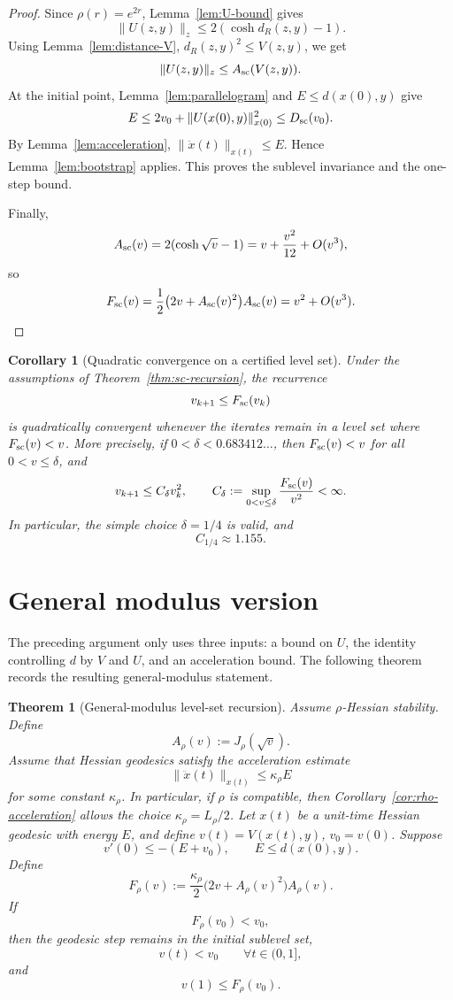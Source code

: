 \documentclass[11pt]{article}
\newtheorem{theorem}{Theorem}
\newtheorem{corollary}{Corollary}
\begin{document}
\begin{proof}
Since \(\rho(r)=e^{2r}\), Lemma~\ref{lem:U-bound} gives
\[
    \|U(z,y)\|_z
    \le
    2(\cosh d_R(z,y)-1).
\]
Using Lemma~\ref{lem:distance-V}, \(d_R(z,y)^2\le V(z,y)\), we get
\[
    \|U(z,y)\|_z
    \le
    A_{\rm sc}(V(z,y)).
\]
At the initial point, Lemma~\ref{lem:parallelogram} and \(E\le d(x(0),y)\) give
\[
    E
    \le
    2v_0+\|U(x(0),y)\|_{x(0)}^2
    \le
    D_{\rm sc}(v_0).
\]
By Lemma~\ref{lem:acceleration}, \(\|\ddot x(t)\|_{x(t)}\le E\). Hence Lemma~\ref{lem:bootstrap} applies.
This proves the sublevel invariance and the one-step bound.

Finally,
\[
    A_{\rm sc}(v)=2(\cosh\sqrt v-1)=v+\frac{v^2}{12}+O(v^3),
\]
so
\[
    F_{\rm sc}(v)
    =
    \frac12\bigl(2v+A_{\rm sc}(v)^2\bigr)A_{\rm sc}(v)
    =v^2+O(v^3).
\]
\end{proof}

\begin{corollary}[Quadratic convergence on a certified level set]
Under the assumptions of Theorem~\ref{thm:sc-recursion}, the recurrence
\[
    v_{k+1}\le F_{\rm sc}(v_k)
\]
is quadratically convergent whenever the iterates remain in a level set where \(F_{\rm sc}(v)<v\). More precisely, if \(0<\delta<0.683412\ldots\), then \(F_{\rm sc}(v)<v\) for all \(0<v\le\delta\), and
\[
    v_{k+1}\le C_\delta v_k^2,
    \qquad
    C_\delta:=\sup_{0<v\le\delta}\frac{F_{\rm sc}(v)}{v^2}<\infty.
\]
In particular, the simple choice \(\delta=1/4\) is valid, and
\[
    C_{1/4}\approx 1.155.
\]
\end{corollary}


\section{General modulus version}

The preceding argument only uses three inputs: a bound on \(U\), the identity controlling \(d\) by \(V\) and \(U\), and an acceleration bound. The following theorem records the resulting general-modulus statement.

\begin{theorem}[General-modulus level-set recursion]\label{thm:general-modulus}
Assume \(\rho\)-Hessian stability. Define
\[
    A_\rho(v):=J_\rho(\sqrt v).
\]
Assume that Hessian geodesics satisfy the acceleration estimate
\[
    \|\ddot x(t)\|_{x(t)}\le \kappa_\rho E
\]
for some constant \(\kappa_\rho\).  In particular, if \(\rho\) is compatible, then
Corollary~\ref{cor:rho-acceleration} allows the choice \(\kappa_\rho=L_\rho/2\).
Let \(x(t)\) be a unit-time Hessian geodesic with energy \(E\), and define \(v(t)=V(x(t),y)\), \(v_0=v(0)\). Suppose
\[
    v'(0)\le -(E+v_0),
    \qquad
    E\le d(x(0),y).
\]
Define
\[
    F_\rho(v):=\frac{\kappa_\rho}{2}\bigl(2v+A_\rho(v)^2\bigr)A_\rho(v).
\]
If
\[
    F_\rho(v_0)<v_0,
\]
then the geodesic step remains in the initial sublevel set,
\[
    v(t)<v_0 \qquad \forall t\in(0,1],
\]
and
\[
    v(1)\le F_\rho(v_0).
\]
\end{theorem}
\end{document}
